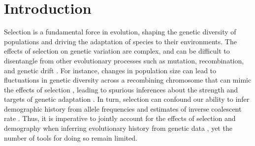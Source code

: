 \documentclass[hidelinks]{article}
\begin{document}
\section*{Introduction}
    \label{introduction}
    Selection is a fundamental force in evolution, shaping the
    genetic diversity of populations and driving the adaptation of
    species to their environments. The effects of selection
    on genetic variation are complex, and can be difficult to disentangle
    from other evolutionary processes such as mutation, recombination,
    and genetic drift \citep[e.g.,][]{ohta1973slightly,lewontin1973distribution, kimura1985neutral, Tajima1989, gillespie1991causes, kern2018neutral}. 
    For instance, changes in population size can lead to fluctuations
    in genetic diversity across a recombining chromosome
    that can mimic the effects of selection \citep{simonsen1995properties},
    leading to spurious inferences about the strength and targets of genetic adaptation
    \citep{simonsen1995properties,akey2004population,nielsen2005genomic}.
    In turn, selection can confound our ability to infer demographic
    history from allele frequencies \citep{ewing2016consequences,schrider2016effects} and
    estimates of inverse coalescent rate \citep{schrider2016effects, johri2021impact, cousins2024accurate}.
    Thus, it is imperative to jointly account for the effects of selection
    and demography when inferring evolutionary history from genetic data \citep[e.g.,][]{sheehan2016deep,johri2020toward},
    yet the number of tools for doing so remain limited.
\end{document}
